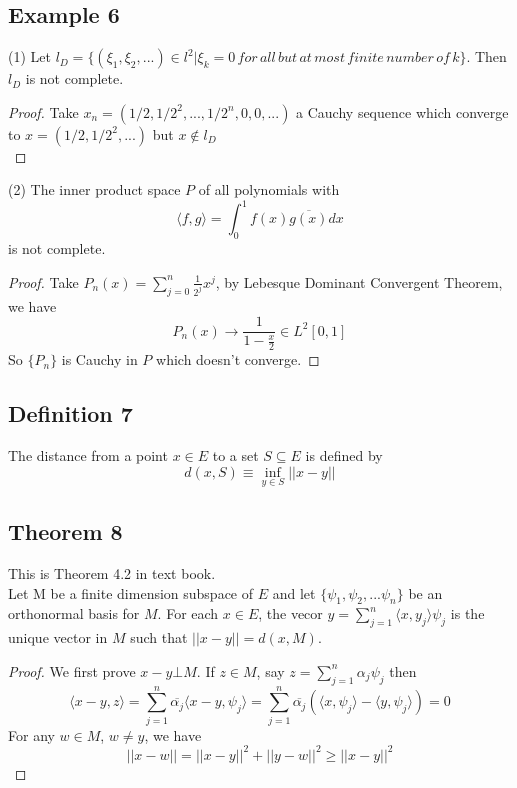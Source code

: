 \documentclass{article}
\begin{document}
\subsection*{Example 6}
(1) Let $l_D=\{(\xi_1, \xi_2, ...) \in l^2 | \xi_k=0\, for\, all\,but\, at\, most\, finite\, number\, of\, k\}$. Then $l_D$ is not complete.
\begin{proof}
Take $x_n= (1/2, 1/2^2, ..., 1/2^n, 0, 0,...)$ a Cauchy sequence which converge to $x=(1/2,1/2^2,...)$ but $x\notin l_D$\\
\end{proof}
(2) The inner product space $P$ of all polynomials with
\[
\langle f,g \rangle = \int_{0}^{1}f(x)\overline{g(x)}dx
\]
is not complete.
\begin{proof}
Take $P_n(x)=\sum_{j=0}^{n}\frac{1}{2^j}x^j$, by Lebesque Dominant Convergent Theorem, we have
\[
P_n(x)\rightarrow \frac{1}{1-\frac{x}{2}} \in L^2[0,1]
\]
So $\{P_n\}$ is Cauchy in $P$ which doesn't converge.
\end{proof}

\subsection*{Definition 7}
The distance from a point $x\in E$ to a set $S\subseteq E$ is defined by
\[
d(x,S)\equiv \inf_{y\in S} || x-y||
\]

\subsection*{Theorem 8}
This is Theorem 4.2 in text book.\\
Let M be a finite dimension subspace of $E$ and let $\{\psi_1, \psi_2, ...\psi_n\}$ be an orthonormal basis for $M$. For each $x\in E$, the vecor $y=\sum_{j=1}^{n}\langle x,y_j \rangle \psi_j$ is the unique vector in $M$ such that $||x-y||=d(x,M)$.
\begin{proof}
We first prove $x-y\bot M$. If $z\in M$, say $z=\sum_{j=1}^{n}\alpha_j\psi_j$ then 
\[
\langle x-y,z \rangle = \sum_{j=1}^{n}\overline{\alpha_j}\langle x-y, \psi_j \rangle=\sum_{j=1}^{n}\overline{\alpha_j}(\langle x, \psi_j \rangle-\langle y, \psi_j \rangle) = 0
\]
For any $w\in M$, $w\neq y$, we have 
\[
||x-w|| = ||x-y||^2+||y-w||^2 \geq ||x-y||^2
\]
\end{proof}
\end{document}
